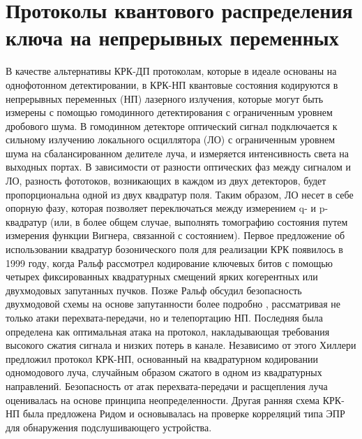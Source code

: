 \section{Протоколы квантового распределения ключа на непрерывных переменных}\label{sec:ch1/CV-QKD review}
В качестве альтернативы КРК-ДП протоколам, которые в идеале основаны на однофотонном детектировании, в КРК-НП \cite{braunstein2005} квантовые состояния кодируются в непрерывных переменных (НП) лазерного излучения, которые могут быть измерены с помощью гомодинного детектирования с ограниченным уровнем дробового шума. В гомодинном детекторе оптический сигнал подключается к сильному излучению локального осциллятора (ЛО) с ограниченным уровнем шума на сбалансированном делителе луча, и измеряется интенсивность света на выходных портах. В зависимости от разности оптических фаз между сигналом и ЛО, разность фототоков, возникающих в каждом из двух детекторов, будет пропорциональна одной из двух квадратур поля. Таким образом, ЛО несет в себе опорную фазу, которая позволяет переключаться между измерением q- и p-квадратур (или, в более общем случае, выполнять томографию состояния путем измерения функции Вигнера, связанной с состоянием).
Первое предложение об использовании квадратур бозонического поля для реализации КРК появилось в 1999 году, когда Ральф \cite{ralph1999} рассмотрел кодирование ключевых битов с помощью четырех фиксированных квадратурных смещений ярких когерентных или двухмодовых запутанных пучков. Позже Ральф обсудил безопасность двухмодовой схемы на основе запутанности более подробно \cite{ralph2000}, рассматривая не только атаки перехвата-передачи, но и телепортацию НП. Последняя была определена как оптимальная атака на протокол, накладывающая требования высокого сжатия сигнала и низких потерь в канале. Независимо от этого Хиллери \cite{hillery2000} предложил протокол КРК-НП, основанный на квадратурном кодировании одномодового луча, случайным образом сжатого в одном из квадратурных направлений. Безопасность от атак перехвата-передачи и расщепления луча оценивалась на основе принципа неопределенности. Другая ранняя схема КРК-НП была предложена Ридом \cite{reid2000} и основывалась на проверке корреляций типа ЭПР для обнаружения подслушивающего устройства.
